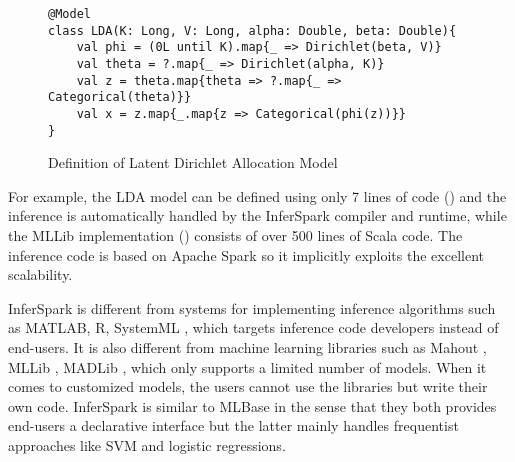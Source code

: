 \begin{figure}
\begin{lstlisting}
@Model
class LDA(K: Long, V: Long, alpha: Double, beta: Double){
	val phi = (0L until K).map{_ => Dirichlet(beta, V)}
	val theta = ?.map{_ => Dirichlet(alpha, K)}
	val z = theta.map{theta => ?.map{_ => Categorical(theta)}}
	val x = z.map{_.map{z => Categorical(phi(z))}}
}
\end{lstlisting}
\label{fig:intro_lda_def}
\caption{Definition of Latent Dirichlet Allocation Model}
\end{figure}

For example, the LDA model can be defined using only 7 lines of code
() and the inference is automatically handled by the
InferSpark compiler and runtime, while the MLLib implementation (\cite{mllib})
consists of over 500 lines of Scala code. The inference code is based on Apache
Spark so it implicitly exploits the excellent scalability.

InferSpark is different from systems
for implementing inference algorithms such as MATLAB, R, SystemML
\cite{systemml}, which targets inference code developers instead of end-users.
It is also different from machine learning libraries such as Mahout
\cite{mahout}, MLLib \cite{mllib}, MADLib \cite{madlib}, which only supports a
limited number of models. When it comes to customized models, the users cannot
use the libraries but write their own code. InferSpark is similar to MLBase
\cite{mlbase} in the sense that they both provides end-users a declarative
interface but the latter mainly handles frequentist approaches like SVM and
logistic regressions. 


